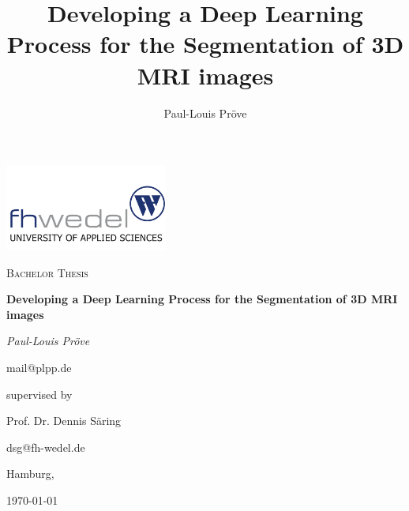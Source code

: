 \documentclass[11pt, a4paper]{article}
\title{Developing a Deep Learning Process for the Segmentation of 3D MRI images}
\author{Paul-Louis Pröve}
\begin{document}
    \begin{titlepage}
    \centering
    \includegraphics[width=0.4\textwidth]{fhw.png}\par
    \vspace{1cm}
    {\scshape\Large Bachelor Thesis\par}
    \vspace{2cm}
    {\bfseries\Huge Developing a Deep Learning Process for the Segmentation of 3D MRI images\par}
    \vspace{2cm}
    {\itshape\Large Paul-Louis Pröve\par}
    mail@plpp.de\par
    \vfill
    supervised by\par
    Prof. Dr. Dennis Säring\par
    dsg@fh-wedel.de\par
    \vspace{1cm}
    Hamburg,\par \today\par
    \end{titlepage}

\tableofcontents
\newpage












\end{document}
